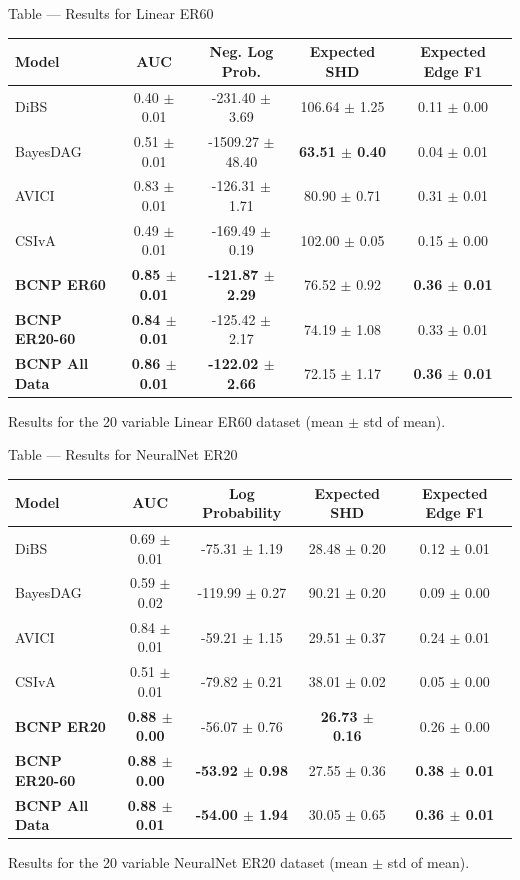 \documentclass[aspectratio=169,10pt]{beamer}
\begin{document}
\begin{frame}{Table --- Results for Linear ER60}
\centering
\scriptsize
\begin{tabular}{lcccc}
\toprule
\textbf{Model} & \textbf{AUC} & \textbf{Neg. Log Prob.} & \textbf{Expected SHD} & \textbf{Expected Edge F1}\\
\midrule
DiBS & 0.40 $\pm$ 0.01 & -231.40 $\pm$ 3.69 & 106.64 $\pm$ 1.25 & 0.11 $\pm$ 0.00\\
BayesDAG & 0.51 $\pm$ 0.01 & -1509.27 $\pm$ 48.40 & \textbf{63.51 $\pm$ 0.40} & 0.04 $\pm$ 0.01\\
AVICI & 0.83 $\pm$ 0.01 & -126.31 $\pm$ 1.71 & 80.90 $\pm$ 0.71 & 0.31 $\pm$ 0.01\\
CSIvA & 0.49 $\pm$ 0.01 & -169.49 $\pm$ 0.19 & 102.00 $\pm$ 0.05 & 0.15 $\pm$ 0.00\\
\textbf{BCNP ER60} & \textbf{0.85 $\pm$ 0.01} & \textbf{-121.87 $\pm$ 2.29} & 76.52 $\pm$ 0.92 & \textbf{0.36 $\pm$ 0.01}\\
\textbf{BCNP ER20-60} & \textbf{0.84 $\pm$ 0.01} & -125.42 $\pm$ 2.17 & 74.19 $\pm$ 1.08 & 0.33 $\pm$ 0.01\\
\textbf{BCNP All Data} & \textbf{0.86 $\pm$ 0.01} & \textbf{-122.02 $\pm$ 2.66} & 72.15 $\pm$ 1.17 & \textbf{0.36 $\pm$ 0.01}\\
\bottomrule
\end{tabular}

\vspace{0.3cm}
{\footnotesize Results for the 20 variable Linear ER60 dataset (mean $\pm$ std of mean).}
\end{frame}

\begin{frame}{Table --- Results for NeuralNet ER20}
\centering
\scriptsize
\begin{tabular}{lcccc}
\toprule
\textbf{Model} & \textbf{AUC} & \textbf{Log Probability} & \textbf{Expected SHD} & \textbf{Expected Edge F1} \\
\midrule
DiBS & 0.69 $\pm$ 0.01 & -75.31 $\pm$ 1.19 & 28.48 $\pm$ 0.20 & 0.12 $\pm$ 0.01 \\
BayesDAG & 0.59 $\pm$ 0.02 & -119.99 $\pm$ 0.27 & 90.21 $\pm$ 0.20 & 0.09 $\pm$ 0.00 \\
AVICI & 0.84 $\pm$ 0.01 & -59.21 $\pm$ 1.15 & 29.51 $\pm$ 0.37 & 0.24 $\pm$ 0.01 \\
CSIvA & 0.51 $\pm$ 0.01 & -79.82 $\pm$ 0.21 & 38.01 $\pm$ 0.02 & 0.05 $\pm$ 0.00 \\
\textbf{BCNP ER20} & \textbf{0.88 $\pm$ 0.00} & -56.07 $\pm$ 0.76 & \textbf{26.73 $\pm$ 0.16} & 0.26 $\pm$ 0.00 \\
\textbf{BCNP ER20-60} & \textbf{0.88 $\pm$ 0.00} & \textbf{-53.92 $\pm$ 0.98} & 27.55 $\pm$ 0.36 & \textbf{0.38 $\pm$ 0.01} \\
\textbf{BCNP All Data} & \textbf{0.88 $\pm$ 0.01} & \textbf{-54.00 $\pm$ 1.94} & 30.05 $\pm$ 0.65 & \textbf{0.36 $\pm$ 0.01} \\
\bottomrule
\end{tabular}

\vspace{0.3cm}
{\footnotesize Results for the 20 variable NeuralNet ER20 dataset (mean $\pm$ std of mean).}
\end{frame}
\end{document}
